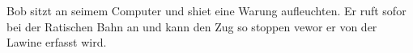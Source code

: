 Bob sitzt an seimem Computer und shiet eine Warung aufleuchten. Er ruft sofor bei der Ratischen Bahn an und kann den Zug so stoppen vewor er von der Lawine erfasst wird.
